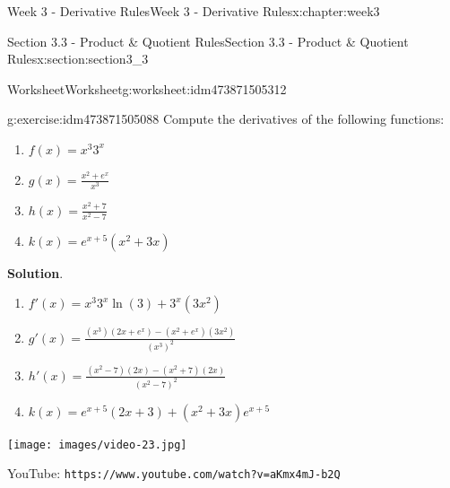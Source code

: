 \documentclass[oneside,10pt,]{book}
\newcommand{\blocktitlefont}{\relax}
\newcommand{\mono}[1]{\texttt{#1}}
\numberwithin{equation}{section}
\newlength{\qrsize}
\newlength{\previewwidth}
\begin{document}
\begin{chapterptx}{Week 3 - Derivative Rules}{}{Week 3 - Derivative Rules}{}{}{x:chapter:week3}
\begin{sectionptx}{Section 3.3 - Product \& Quotient Rules}{}{Section 3.3 - Product \& Quotient Rules}{}{}{x:section:section3_3}
%
%
\typeout{************************************************}
\typeout{************************************************}
%
\begin{worksheet-subsection}{Worksheet}{}{Worksheet}{}{}{g:worksheet:idm473871505312}
\begin{divisionexercise}{1}{}{}{g:exercise:idm473871505088}%
Compute the derivatives of the following functions:%
%
\begin{enumerate}[label=(\alph*)]
\item{}\(\displaystyle f(x) = x^3 3^x\)%
\item{}\(\displaystyle g(x) = \frac{x^2 + e^x}{x^3}\)%
\item{}\(\displaystyle h(x) = \frac{x^2+7}{x^2-7}\)%
\item{}\(\displaystyle k(x) = e^{x+5}(x^2+3x)\)%
\end{enumerate}
\textbf{\blocktitlefont Solution}.\hypertarget{g:solution:idm473871502480}{}\quad{}%
\begin{enumerate}[label=(\alph*)]
\item{}\(\displaystyle f'(x) = x^3 3^x\ln(3)+3^x(3x^2)\)%
\item{}\(\displaystyle g'(x) = \frac{(x^3)(2x+e^x)-(x^2 + e^x)(3x^2)}{(x^3)^2}\)%
\item{}\(\displaystyle h'(x) = \frac{(x^2-7)(2x)-(x^2+7)(2x)}{(x^2-7)^2}\)%
\item{}\(\displaystyle k(x) = e^{x+5}(2x+3)+(x^2+3x)e^{x+5}\)%
\end{enumerate}
\end{divisionexercise}%
\end{worksheet-subsection}
\restoregeometry
\setlength{\qrsize}{9em}
\setlength{\previewwidth}{\linewidth}
\addtolength{\previewwidth}{-\qrsize}
\begin{tcbraster}[raster columns=2, raster column skip=1pt, raster halign=center, raster force size=false, raster left skip=0pt, raster right skip=0pt]%
\begin{tcolorbox}[previewstyle, width=\previewwidth]%
\texttt{[image: images/video-23.jpg]}%
\end{tcolorbox}%
\begin{tcolorbox}[qrstyle]%
{\hypersetup{urlcolor=black}}%
\end{tcolorbox}%
\begin{tcolorbox}[captionstyle]%
\small YouTube: \mono{https://www.youtube.com/watch?v=aKmx4mJ-b2Q}\end{tcolorbox}%

\end{tcbraster}
\end{sectionptx}
\end{chapterptx}
\end{document}
